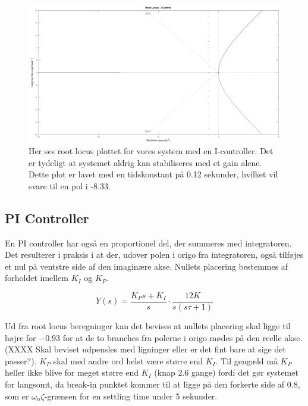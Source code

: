 \begin{figure}[ht]
	\begin{center}
		\includegraphics[scale=0.35]{Billeder/I_rlocus.PNG}
	\end{center}
\caption{Her ses root locus plottet for vores system med en I-controller. Det er tydeligt at systemet aldrig kan stabiliseres med et gain alene. Dette plot er lavet med en tidskonstant på 0.12 sekunder, hvilket vil svare til en pol i -8.33.}
\label{fig:I_rlocus}
\end{figure}

\subsection{PI Controller}

En PI controller har også en proportionel del, der summeres med integratoren. Det resulterer i praksis i at der, udover polen i origo fra integratoren, også tilføjes et nul på ventstre side af den imaginære akse. Nullets placering bestemmes af forholdet imellem $K_{I}$ og $K_{P}$.

\begin{equation}\label{PI_OpenLoop}
Y(s)=\frac{K_{P}s+K_{I}}{s}\cdot\frac{12K}{s(s\tau+1)}
\end{equation}

Ud fra root locus beregninger kan det bevises at nullets placering skal ligge til højre for $-0.93$ for at de to branches fra polerne i origo mødes på den reelle akse. (XXXX Skal beviset udpensles med ligninger eller er det fint bare at sige det passer?). $K_{P}$ skal med andre ord helst være større end $K_{I}$. Til gengæld må $K_{P}$ heller ikke blive for meget større end $K_{I}$ (knap $2.6$ gange) fordi det gør systemet for langsomt, da break-in punktet kommer til at ligge på den forkerte side af $0.8$, som er $\omega_{n}\zeta$-grænsen for en settling time under 5 sekunder. 

